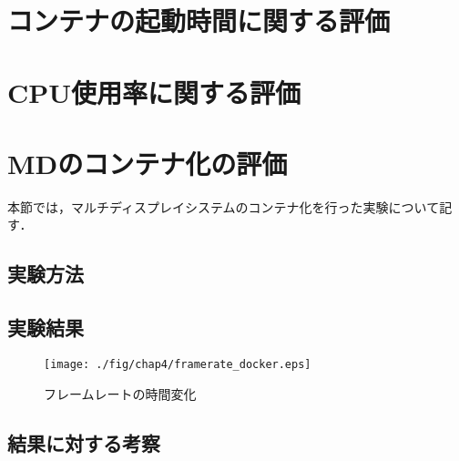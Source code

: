 \section{コンテナの起動時間に関する評価}

\section{CPU使用率に関する評価}
\section{MDのコンテナ化の評価}
本節では，マルチディスプレイシステムのコンテナ化を行った実験について記す．

\subsection{実験方法}


\subsection{実験結果}

\begin{figure}[H]
    \hspace*{\fill}
    \texttt{[image: ./fig/chap4/framerate\_docker.eps]}
    \hspace*{\fill}
    \caption{フレームレートの時間変化}
\end{figure}



\subsection{結果に対する考察}